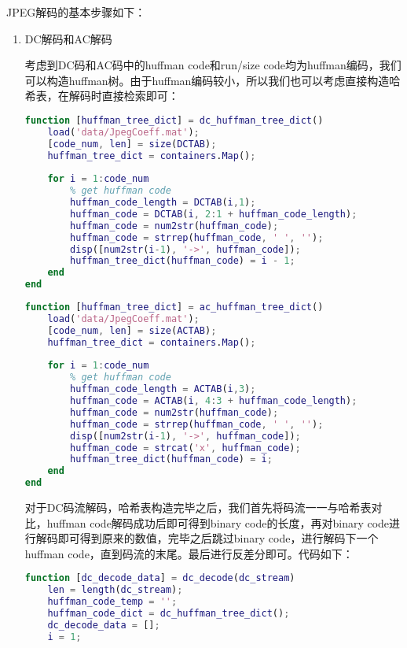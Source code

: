\documentclass[a4paper]{article}
\begin{document}
\par JPEG解码的基本步骤如下：
\begin{enumerate}
    \item DC解码和AC解码
    \par 考虑到DC码和AC码中的huffman code和run/size code均为huffman编码，我们可以构造huffman树。由于huffman编码较小，所以我们也可以考虑直接构造哈希表，在解码时直接检索即可：
    \begin{lstlisting}[language=matlab, caption=dc huffman tree]
function [huffman_tree_dict] = dc_huffman_tree_dict()
    load('data/JpegCoeff.mat');
    [code_num, len] = size(DCTAB);
    huffman_tree_dict = containers.Map();
    
    for i = 1:code_num
        % get huffman code
        huffman_code_length = DCTAB(i,1);
        huffman_code = DCTAB(i, 2:1 + huffman_code_length);
        huffman_code = num2str(huffman_code);
        huffman_code = strrep(huffman_code, ' ', '');
        disp([num2str(i-1), '->', huffman_code]);
        huffman_tree_dict(huffman_code) = i - 1;
    end
end
    \end{lstlisting}
    
    \begin{lstlisting}[language=matlab, caption=ac huffman tree]
function [huffman_tree_dict] = ac_huffman_tree_dict()
    load('data/JpegCoeff.mat');
    [code_num, len] = size(ACTAB);
    huffman_tree_dict = containers.Map();
    
    for i = 1:code_num
        % get huffman code
        huffman_code_length = ACTAB(i,3);
        huffman_code = ACTAB(i, 4:3 + huffman_code_length);
        huffman_code = num2str(huffman_code);
        huffman_code = strrep(huffman_code, ' ', '');
        disp([num2str(i-1), '->', huffman_code]);
        huffman_code = strcat('x', huffman_code);
        huffman_tree_dict(huffman_code) = i;
    end
end
    \end{lstlisting}
    
    \par 对于DC码流解码，哈希表构造完毕之后，我们首先将码流一一与哈希表对比，huffman code解码成功后即可得到binary code的长度，再对binary code进行解码即可得到原来的数值，完毕之后跳过binary code，进行解码下一个huffman code，直到码流的末尾。最后进行反差分即可。代码如下：
    \begin{lstlisting}[language=matlab, caption=dc decode]
function [dc_decode_data] = dc_decode(dc_stream)
    len = length(dc_stream);
    huffman_code_temp = '';
    huffman_code_dict = dc_huffman_tree_dict();
    dc_decode_data = [];
    i = 1;
    

\end{lstlisting}
\end{enumerate}
\end{document}
